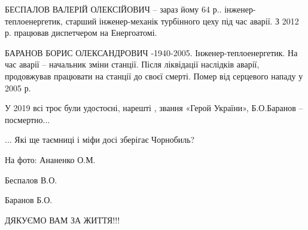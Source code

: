 БЕСПАЛОВ ВАЛЕРІЙ ОЛЕКСІЙОВИЧ – зараз йому 64 р.. інженер-теплоенергетик,
старший інженер-механік турбінного цеху під час аварії.  З 2012 р. працював
диспетчером на Енергоатомі.

БАРАНОВ  БОРИС ОЛЕКСАНДРОВИЧ -1940-2005. Інженер-теплоенергетик. На час аварії
– начальник зміни станції. Після ліквідації наслідків аварії, продовжував
працювати на станції до своєї смерті. Помер від серцевого нападу у 2005 р.

У 2019 всі троє були удостоєні, нарешті , звання «Герой України», Б.О.Баранов –
посмертно...

... Які ще таємниці і міфи досі зберігає Чорнобиль? 

На фото: Ананенко О.М.

Беспалов В.О. 

Баранов Б.О.

ДЯКУЄМО ВАМ ЗА ЖИТТЯ!!!


